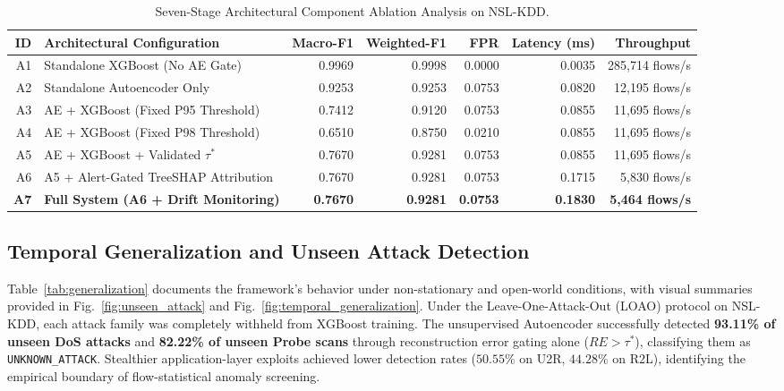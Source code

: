 \documentclass[journal]{IEEEtran}
\begin{document}
\begin{table}[!t]
\centering
\caption{Seven-Stage Architectural Component Ablation Analysis on NSL-KDD.}
\label{tab:ablation}
\small
\begin{tabularx}{\textwidth}{r Y r r r r r}
\toprule
\textbf{ID} & \textbf{Architectural Configuration} & \textbf{Macro-F1} & \textbf{Weighted-F1} & \textbf{FPR} & \textbf{Latency (ms)} & \textbf{Throughput}\\
\midrule
A1 & Standalone XGBoost (No AE Gate) & 0.9969 & 0.9998 & 0.0000 & 0.0035 & 285,714 flows/s\\
A2 & Standalone Autoencoder Only & 0.9253 & 0.9253 & 0.0753 & 0.0820 & 12,195 flows/s\\
A3 & AE + XGBoost (Fixed P95 Threshold) & 0.7412 & 0.9120 & 0.0753 & 0.0855 & 11,695 flows/s\\
A4 & AE + XGBoost (Fixed P98 Threshold) & 0.6510 & 0.8750 & 0.0210 & 0.0855 & 11,695 flows/s\\
A5 & AE + XGBoost + Validated $\tau^*$ & 0.7670 & 0.9281 & 0.0753 & 0.0855 & 11,695 flows/s\\
A6 & A5 + Alert-Gated TreeSHAP Attribution & 0.7670 & 0.9281 & 0.0753 & 0.1715 & 5,830 flows/s\\
\textbf{A7} & \textbf{Full System (A6 + Drift Monitoring)} & \textbf{0.7670} & \textbf{0.9281} & \textbf{0.0753} & \textbf{0.1830} & \textbf{5,464 flows/s}\\
\bottomrule
\end{tabularx}
\end{table}

\subsection{Temporal Generalization and Unseen Attack Detection}
Table~\ref{tab:generalization} documents the framework's behavior under non-stationary and open-world conditions, with visual summaries provided in Fig.~\ref{fig:unseen_attack} and Fig.~\ref{fig:temporal_generalization}. Under the Leave-One-Attack-Out (LOAO) protocol on NSL-KDD, each attack family was completely withheld from XGBoost training. The unsupervised Autoencoder successfully detected \textbf{93.11\% of unseen DoS attacks} and \textbf{82.22\% of unseen Probe scans} through reconstruction error gating alone ($RE > \tau^*$), classifying them as \texttt{UNKNOWN\_ATTACK}. Stealthier application-layer exploits achieved lower detection rates ($50.55\%$ on U2R, $44.28\%$ on R2L), identifying the empirical boundary of flow-statistical anomaly screening.
\end{document}
